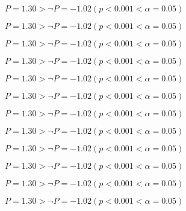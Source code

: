 \documentclass{article}
\begin{document}
        \begin{card}[note][H2.2 vérifiée]
            $P = 1.30 > \neg P = -1.02 (p < 0.001 < \alpha = 0.05)$  
        \end{card}

        \begin{card}[note]
            $P = 1.30 > \neg P = -1.02 (p < 0.001 < \alpha = 0.05)$  
        \end{card}
        
        \begin{card}[check][H2.2 vérifiée]
            $P = 1.30 > \neg P = -1.02 (p < 0.001 < \alpha = 0.05)$  
        \end{card}

        \begin{card}[check]
            $P = 1.30 > \neg P = -1.02 (p < 0.001 < \alpha = 0.05)$  
        \end{card}
        
        \begin{card}[info][H2.2 vérifiée]
            $P = 1.30 > \neg P = -1.02 (p < 0.001 < \alpha = 0.05)$  
        \end{card}

        \begin{card}[info]
            $P = 1.30 > \neg P = -1.02 (p < 0.001 < \alpha = 0.05)$  
        \end{card}
        
        \begin{card}[warning][H2.2 vérifiée]
            $P = 1.30 > \neg P = -1.02 (p < 0.001 < \alpha = 0.05)$  
        \end{card}

        \begin{card}[warning]
            $P = 1.30 > \neg P = -1.02 (p < 0.001 < \alpha = 0.05)$  
        \end{card}
        
        \begin{card}[error][H2.2 vérifiée]
            $P = 1.30 > \neg P = -1.02 (p < 0.001 < \alpha = 0.05)$  
        \end{card}

        \begin{card}[error]
            $P = 1.30 > \neg P = -1.02 (p < 0.001 < \alpha = 0.05)$  
        \end{card}
        
        \begin{card}[idea][H2.2 vérifiée]
            $P = 1.30 > \neg P = -1.02 (p < 0.001 < \alpha = 0.05)$  
        \end{card}

        \begin{card}[idea]
            $P = 1.30 > \neg P = -1.02 (p < 0.001 < \alpha = 0.05)$  
        \end{card}
        
\end{document}
